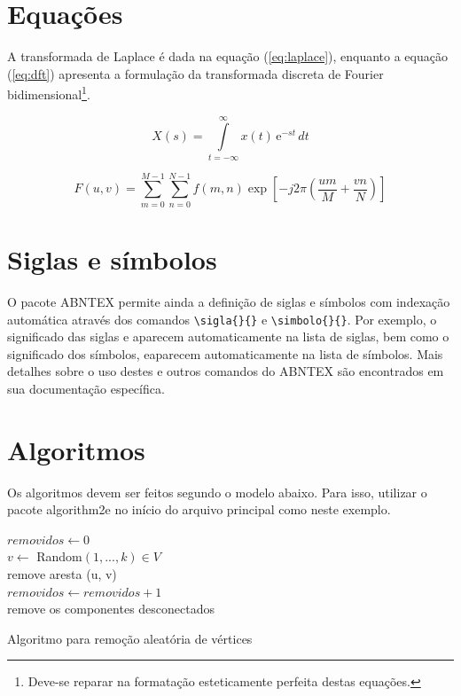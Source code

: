 \section{Equações}
\label{sec:equacoes}

A transformada de Laplace é dada na equação (\ref{eq:laplace}), enquanto a equação (\ref{eq:dft}) apresenta a formulação da transformada discreta de Fourier bidimensional\footnote{Deve-se reparar na formatação esteticamente perfeita destas equações.}.

\begin{equation}
	X(s) = \int\limits_{t = -\infty}^{\infty} x(t) \, \text{e}^{-st} \, dt
	\label{eq:laplace}
\end{equation}

\begin{equation}
	F(u, v) = \sum_{m = 0}^{M - 1} \sum_{n = 0}^{N - 1} f(m, n) \exp \left[ -j 2 \pi \left( \frac{u m}{M} + \frac{v n}{N} \right) \right]
	\label{eq:dft}
\end{equation}

\section{Siglas e símbolos}
\label{sec:siglas}

O pacote ABNTEX permite ainda a definição de siglas e símbolos com indexação automática através dos comandos \verb#\sigla{}{}# e \verb#\simbolo{}{}#. Por exemplo, o significado das siglas  e  aparecem automaticamente na lista de siglas, bem como o significado dos símbolos, eaparecem automaticamente na lista de símbolos. Mais detalhes sobre o uso destes e outros comandos do ABNTEX são encontrados em sua documentação específica\cite{abnTeX2009}.

\section{Algoritmos}
\label{sec:algoritmos}

Os algoritmos devem ser feitos segundo o modelo abaixo. 
Para isso, utilizar o pacote  {\ttfamily algorithm2e} no início do arquivo principal como neste exemplo.

\begin{algorithm}
 $removidos \leftarrow 0$ \\
  {
   $v \leftarrow$ Random$(1, ..., k) \in V$ \\
      {
	remove aresta (u, v)\\
	$removidos \leftarrow removidos + 1$\\
     }
      {
	remove os componentes desconectados\\
     }
   }
\caption{Algoritmo para remoção aleatória de vértices}
\end{algorithm}
